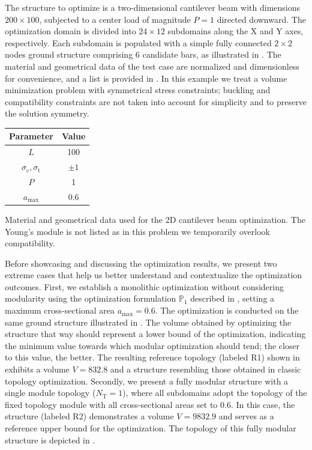 The structure to optimize is a two-dimensional cantilever beam with dimensions $200\times100$, subjected to a center load of magnitude $P=1$ directed downward. The optimization domain is divided into $24\times12$ subdomains along the X and Y axes, respectively. Each subdomain is populated with a simple fully connected $2\times2$ nodes ground structure comprising 6 candidate bars, as illustrated in . The material and geometrical data of the test case are normalized and dimensionless for convenience, and a list is provided in . In this example we treat a volume minimization problem with symmetrical stress constraints; buckling and compatibility constraints are not taken into account for simplicity and to preserve the solution symmetry.

\begin{margintable}
    \small
    \centering
    \begin{tabular}{cc}
    \toprule
    \textbf{Parameter}        & \textbf{Value} \\ \midrule
    $L$              & 100     \\
    $\sigma_\text{c}, \sigma_\text{t}$ & $\pm 1$\\
    $P$              & 1   \\
    $a_\text{max}$              & 0.6   \\
    \bottomrule
    \end{tabular}
    \caption{Material and geometrical data used for the 2D cantilever beam optimization. The Young's module is not listed as in this problem we temporarily overlook compatibility.}
    \label{tab:06_modular_cant_data}
\end{margintable}

Before showcasing and discussing the optimization results, we present two extreme cases that help us better understand and contextualize the optimization outcomes. First, we establish a monolithic optimization without considering modularity using the optimization formulation $\mathbb{P}_1$ described in , setting a maximum cross-sectional area $a_\text{max}=0.6$. The optimization is conducted on the same ground structure illustrated in . The volume obtained by optimizing the structure that way should represent a lower bound of the optimization, indicating the minimum value towards which modular optimization should tend; the closer to this value, the better. The resulting reference topology (labeled R1) shown in  exhibits a volume $V=832.8$ and a structure resembling those obtained in classic topology optimization. Secondly, we present a fully modular structure with a single module topology ($N_\text{T}=1$), where all subdomains adopt the topology of the fixed topology module with all cross-sectional areas set to 0.6. In this case, the structure (labeled R2) demonstrates a volume $V=9832.9$ and serves as a reference upper bound for the optimization. The topology of this fully modular structure is depicted in .

